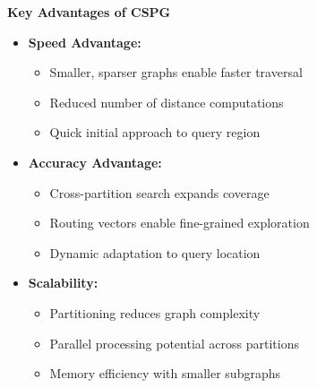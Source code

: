 \begin{frame}
\begin{center}
\Large\textbf{Key Advantages of CSPG}
\end{center}

\vspace{10pt}

\begin{itemize}
    \item \textbf{Speed Advantage:}
    \begin{itemize}
        \item Smaller, sparser graphs enable faster traversal
        \item Reduced number of distance computations
        \item Quick initial approach to query region
    \end{itemize}
    
    \item \textbf{Accuracy Advantage:}
    \begin{itemize}
        \item Cross-partition search expands coverage
        \item Routing vectors enable fine-grained exploration
        \item Dynamic adaptation to query location
    \end{itemize}
    
    \item \textbf{Scalability:}
    \begin{itemize}
        \item Partitioning reduces graph complexity
        \item Parallel processing potential across partitions
        \item Memory efficiency with smaller subgraphs
    \end{itemize}
\end{itemize}
\end{frame}%
